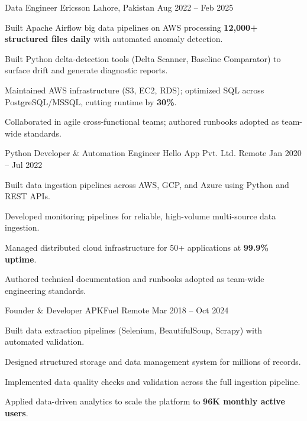 \documentclass[11pt, a4paper]{awesome-cv}
\begin{document}
\begin{cventries}

\cventry
{Data Engineer}
{Ericsson}
{Lahore, Pakistan}
{Aug 2022 -- Feb 2025}
{
\begin{cvitems}
\item {Built Apache Airflow big data pipelines on AWS processing \textbf{12,000+ structured files daily} with automated anomaly detection.}
\item {Built Python delta-detection tools (Delta Scanner, Baseline Comparator) to surface drift and generate diagnostic reports.}
\item {Maintained AWS infrastructure (S3, EC2, RDS); optimized SQL across PostgreSQL/MSSQL, cutting runtime by \textbf{30\%}.}
\item {Collaborated in agile cross-functional teams; authored runbooks adopted as team-wide standards.}
\end{cvitems}
}

\cventry
{Python Developer \& Automation Engineer}
{Hello App Pvt. Ltd.}
{Remote}
{Jan 2020 -- Jul 2022}
{
\begin{cvitems}
\item {Built data ingestion pipelines across AWS, GCP, and Azure using Python and REST APIs.}
\item {Developed monitoring pipelines for reliable, high-volume multi-source data ingestion.}
\item {Managed distributed cloud infrastructure for 50+ applications at \textbf{99.9\% uptime}.}
\item {Authored technical documentation and runbooks adopted as team-wide engineering standards.}
\end{cvitems}
}

\cventry
{Founder \& Developer}
{APKFuel}
{Remote}
{Mar 2018 -- Oct 2024}
{
\begin{cvitems}
\item {Built data extraction pipelines (Selenium, BeautifulSoup, Scrapy) with automated validation.}
\item {Designed structured storage and data management system for millions of records.}
\item {Implemented data quality checks and validation across the full ingestion pipeline.}
\item {Applied data-driven analytics to scale the platform to \textbf{96K monthly active users}.}
\end{cvitems}
}

\end{cventries}
\end{document}
